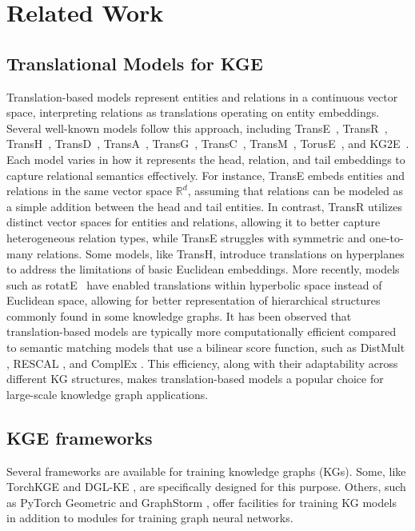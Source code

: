 \section{Related Work}
\subsection{Translational Models for KGE}
Translation-based models represent entities and relations in a continuous vector space, interpreting relations as translations operating on entity embeddings. Several well-known models follow this approach, including TransE~\cite{TransE}, TransR~\cite{transR}, TransH~\cite{TransH}, TransD~\cite{transD}, TransA~\cite{transA}, TransG~\cite{transG},
TransC~\cite{lv2018differentiating}, TransM~\cite{fan2014transition}, 
TorusE~\cite{torusE}, and KG2E~\cite{KG2E}. Each model varies in how it represents the head, relation, and tail embeddings to capture relational semantics effectively.
For instance, TransE embeds entities and relations in the same vector space $\mathbb{R}^d$, assuming that relations can be modeled as a simple addition between the head and tail entities. In contrast, TransR utilizes distinct vector spaces for entities and relations, allowing it to better capture heterogeneous relation types, while TransE struggles with symmetric and one-to-many relations.
Some models, like TransH, introduce translations on hyperplanes to address the limitations of basic Euclidean embeddings. More recently, models such as rotatE~\cite{rotatE} have enabled translations within hyperbolic space instead of Euclidean space, allowing for better representation of hierarchical structures commonly found in some knowledge graphs.
It has been observed that translation-based models are typically more computationally efficient compared to semantic matching models that use a bilinear score function, such as DistMult \cite{DistMult}, RESCAL \cite{RESCAL}, and ComplEx \cite{ComplEx}. This efficiency, along with their adaptability across different KG structures, makes translation-based models a popular choice for large-scale knowledge graph applications.

\subsection{KGE frameworks}
Several frameworks are available for training knowledge graphs (KGs). Some, like TorchKGE \cite{boschin2020torchkge} and DGL-KE \cite{zheng2020dgl}, are specifically designed for this purpose. Others, such as PyTorch Geometric \cite{fey2019fast} and GraphStorm \cite{zheng2024graphstorm}, offer facilities for training KG models in addition to modules for training graph neural networks. 

